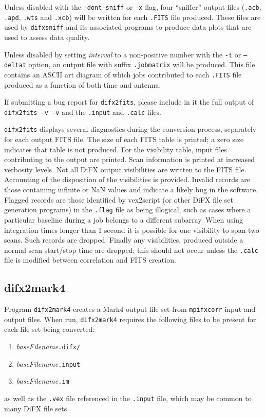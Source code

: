 Unless disabled with the {\tt --dont-sniff} or {\tt -x} flag, four ``sniffer'' output files ({\tt .acb}, {\tt .apd}, {\tt .wts} and {\tt .xcb}) will be written for each {\tt .FITS} file produced.  
These files are used by {\tt difxsniff} and its associated programs to produce data plots that are used to assess data quality.

Unless disabled by setting {\em interval} to a non-positive number with the {\tt -t} or {\tt --deltat} option, an output file with suffix {\tt .jobmatrix} will be produced. 
This file contains an ASCII art diagram of which jobs contributed to each {\tt .FITS} file produced as a function of both time and antenna.

If submitting a bug report for {\tt difx2fits}, please include in it the full output of {\tt difx2fits -v -v} and the {\tt .input} and {\tt .calc} files.

{\tt difx2fits} displays several diagnostics during the conversion process, separately for each output FITS file.
The size of each FITS table is printed; a zero size indicates that table is not produced.
For the visibility table, input files contributing to the output are printed.
Scan information is printed at increased verbosity levels.
Not all DiFX output visibilities are written to the FITS file.
Accounting of the disposition of the visibilities is provided.
Invalid records are those containing infinite or NaN values and indicate a likely bug in the software.
Flagged records are those identified by vex2script (or other DiFX file set generation programs) in the {\tt .flag} file as being illogical, such as cases where a particular baseline during a job belongs to a different subarray.
When using integration times longer than 1 second it is possible for one visibility to span two scans.  
Such records are dropped.
Finally any visibilities, produced outside a normal scan start/stop time are dropped; this should not occur unless the {\tt .calc} file is modified between correlation and FITS creation.








\subsection{difx2mark4} \label{sec:difx2mark4}

Program {\tt difx2mark4} creates a Mark4 output file set from {\tt mpifxcorr} input and output files.
When run, {\tt difx2mark4} requires the following files to be present for each file set being converted:
\begin{enumerate}
\item {\em baseFilename}{\tt .difx/}
\item {\em baseFilename}{\tt .input}
\item {\em baseFilename}{\tt .im}
\end{enumerate}
as well as the {\tt .vex} file referenced in the {\tt .input} file, which may be common to many DiFX file sets.

